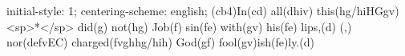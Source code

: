 initial-style: 1;
centering-scheme: english;
(cb4)In(cd) all(dhiv) this(hg/hiHGgv) <sp>*</sp> did(g) not(hg) Job(f) sin(fe) with(gv) his(fe) lips,(d) (,) nor(defvEC) charged(fvghhg/hih) God(gf) fool(gv)ish(fe)ly.(d)

